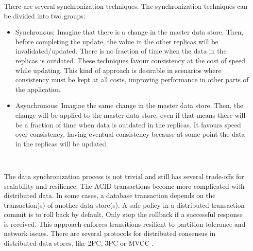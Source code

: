 \documentclass[12pt,english]{article} %
\begin{document}
There are several synchronization techniques.
The synchronization techniques can be divided into two groups:
\begin{itemize}
    \item Synchronous: Imagine that there is a change in the master data store.
    Then, before completing the update, the value in the other replicas will be invalidated/updated.
    There is no fraction of time when the data in the replicas is outdated.
    These techniques favour consistency at the cost of speed while updating.
    This kind of approach is desirable in scenarios where consistency must be kept at all costs, improving performance in other parts of the application.
    \item Asynchronous: Imagine the same change in the master data store.
    Then, the change will be applied to the master data store, even if that means there will be a fraction of time when data is outdated in the replicas.
    It favours speed over consistency, having eventual consistency because at some point the data in the replicas will be updated.
\end{itemize}

\

The data synchronization process is not trivial and still has several trade-offs for scalability and resilience.
The ACID transactions become more complicated with distributed data. In some cases, a database transaction depends on the transaction(s) of another data store(s).
A safe policy in a distributed transaction commit is to roll back by default. Only stop the rollback if a successful response is received. 
This approach enforces transitions resilient to partition tolerance and network issues.
There are several protocols for distributed consensus in distributed data stores, like 2PC, 3PC or MVCC \cite{distributed-consensus-data-replication}. 
\end{document}
